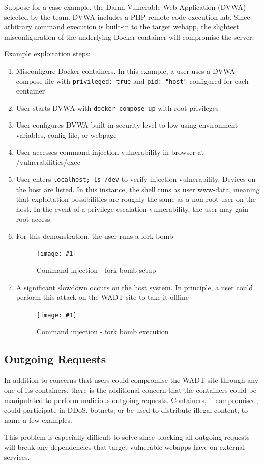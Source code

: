 \documentclass[12pt]{article}
\newcommand{\simplegraphic}[3] {
\begin{figure}[H]
	\centering
	\texttt{[image: \#1]}
	\caption{#2}
	\label{#3}
\end{figure}
}
\begin{document}
Suppose for a case example, the Damn Vulnerable Web Application (DVWA) selected by the team. DVWA includes a PHP remote code execution lab. Since arbitrary command execution is built-in to the target webapp, the slightest misconfiguration of the underlying Docker container will compromise the server.

Example exploitation steps:
\begin{enumerate}
	\item Misconfigure Docker containers. In this example, a user uses a DVWA compose file with \texttt{privileged: true} and \texttt{pid: "host"} configured for each container
	\item User starts DVWA with \texttt{docker compose up} with root privileges
	\item User configures DVWA built-in security level to low using environment variables, config file, or webpage
	\item User accesses command injection vulnerability in browser at /vulnerabilities/exec
	\item User enters \texttt{localhost; ls /dev} to verify injection vulnerability. Devices on the host are listed. In this instance, the shell runs as user www-data, meaning that exploitation possibilities are roughly the same as a non-root user on the host. In the event of a privilege escalation vulnerability, the user may gain root access
	\item For this demonstration, the user runs a fork bomb
		\simplegraphic{fork-bomb}{Command injection - fork bomb setup}{fig:forkbomb}
	\item A significant slowdown occurs on the host system. In principle, a user could perform this attack on the WADT site to take it offline
		\simplegraphic{cannot-fork}{Command injection - fork bomb execution}{fig:forkbomb-exec}
\end{enumerate}

\subsection{Outgoing Requests}
In addition to concerns that users could compromise the WADT site through any one of its containers, there is the additional concern that the containers could be manipulated to perform malicious outgoing requests. Containers, if compromised, could participate in DDoS, botnets, or be used to distribute illegal content, to name a few examples.

This problem is especially difficult to solve since blocking all outgoing requests will break any dependencies that target vulnerable webapps have on external services.
\end{document}
